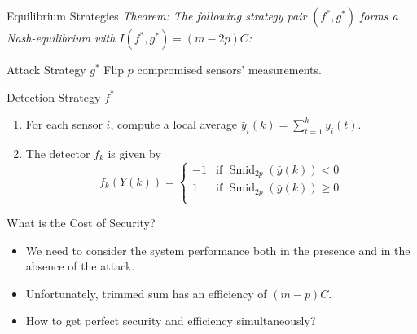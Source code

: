 \documentclass[10pt]{beamer}
\newcommand{\tikzdir}[1]{#1.tikz}
\newcommand{\inputtikz}[1]{}}
\DeclareMathOperator{\Smid}{Smid}
\begin{document}
\begin{frame}{Equilibrium Strategies}
  \it Theorem: The following strategy pair $(f^*,g^*)$ forms a Nash-equilibrium with $I(f^*,g^*) = (m-2p)C$:
  \begin{block}{Attack Strategy $g^*$}
    Flip $p$ compromised sensors' measurements.
  \end{block}
  \begin{block}{Detection Strategy $f^*$}
    \begin{enumerate}
    \item For each sensor $i$, compute a local average $ \bar y_i(k) = \sum_{t=1}^k y_i(t)$.
    \item The detector $f_k$ is given by
      \begin{displaymath}
        f_k(Y(k)) = \begin{cases}
          -1 &\text{if }\Smid_{2p}(\bar y(k))< 0\\
          1 &\text{if }\Smid_{2p}(\bar y(k))\geq 0\\
        \end{cases}
      \end{displaymath}
    \end{enumerate}
  \end{block}
\end{frame}

\begin{frame}{What is the Cost of Security?}
  \begin{itemize}
  \item We need to consider the system performance both in the presence and in the absence of the attack.
    \vspace{0.5cm}
    \begin{center}
      \inputtikz{fun_lim2}
    \end{center}
  \item Unfortunately, trimmed sum has an efficiency of $(m-p)C$.
  \item How to get perfect security and efficiency simultaneously?
  \end{itemize}
\end{frame}

\end{document}
